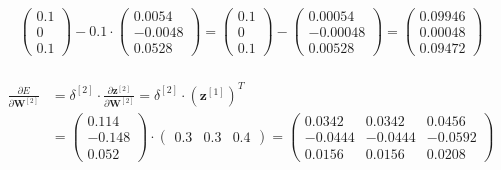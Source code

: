 \documentclass[12pt]{article}
\begin{document}
\begin{enumerate}
\begin{equation*}
\begin{aligned}
\begin{pmatrix}
            0.1\\
            0\\
            0.1
        \end{pmatrix} - 0.1 \cdot \begin{pmatrix}
            0.0054 \\
            -0.0048 \\
            0.0528
        \end{pmatrix} = \begin{pmatrix}
            0.1\\
            0\\
            0.1
        \end{pmatrix} - \begin{pmatrix}
            0.00054\\
            -0.00048\\
            0.00528
        \end{pmatrix} = \begin{pmatrix}
            0.09946\\
            0.00048\\
            0.09472
        \end{pmatrix}
    \end{aligned}
\end{equation*}

\begin{equation*}
    \begin{aligned}
        \\
        \frac{\partial E}{\partial \mathbf{W}^{[2]}} &= \delta^{[2]} \cdot \frac{\partial \mathbf{z}^{[2]}}{\partial \mathbf{W}^{[2]}} = \delta^{[2]} \cdot \left(\mathbf{z}^{[1]}\right)^T \\
        &= \begin{pmatrix}
            0.114 \\
            -0.148 \\
            0.052
        \end{pmatrix} \cdot \begin{pmatrix}
            0.3 & 0.3 & 0.4
        \end{pmatrix} = \begin{pmatrix}
            0.0342 & 0.0342 & 0.0456\\
            -0.0444 & -0.0444 & -0.0592\\
            0.0156 & 0.0156 & 0.0208
        \end{pmatrix}
    \end{aligned}
\end{equation*}



\end{enumerate}
\end{document}
